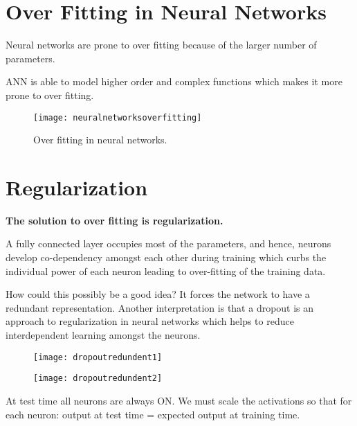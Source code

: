 	\section{Over Fitting in Neural Networks}

	\begin{bulletedlist}
		\item Neural networks are prone to over fitting because of the larger number of parameters.
		\item ANN is able to model higher order and complex functions which makes it more prone to over fitting.
	\end{bulletedlist}

 	\begin{figure}[h]
		\centering
		\texttt{[image: neuralnetworksoverfitting]}
		\caption{Over fitting in neural networks.}
		\label{fig:neuralnetworksoverfitting}
	\end{figure}

	\section{Regularization}
{\bfseries The solution to over fitting is regularization.}

A fully connected layer occupies most of the parameters, and hence, neurons develop co-dependency amongst each other during training which curbs the individual power of each neuron leading to over-fitting of the training data.

How could this possibly be a good idea?  It forces the network to have a redundant representation.  Another interpretation is that a dropout is an approach to regularization in neural networks which helps to reduce interdependent learning amongst the neurons.

	\begin{figure}[tbp]
		\begin{minipage}[t]{0.475\textwidth}
			\centering
			\texttt{[image: dropoutredundent1]}
			\label{fig:dropoutredundent1}
		\end{minipage}
		\hfill
		\begin{minipage}[t]{0.475\textwidth}
			\centering
			\texttt{[image: dropoutredundent2]}
			\label{fig:dropoutredundent2}
		\end{minipage}
	\end{figure}

At test time all neurons are always ON.  We must scale the activations so that for each neuron: output at test time = expected output at training time.

